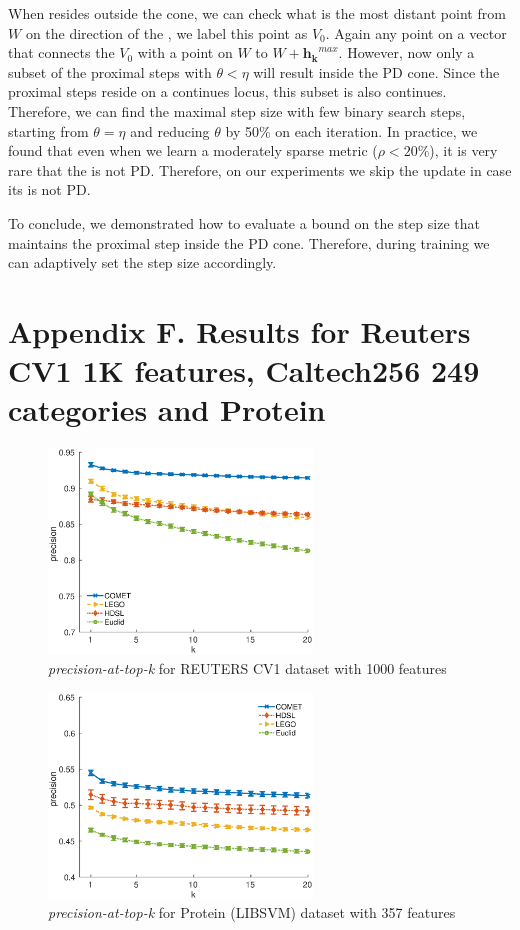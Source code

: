 \documentclass[twoside,11pt]{article}
\newcommand\mat[1]{{#1}}
\renewcommand\vec[1]{\mathbf{#1}}
\newcommand{\W}{\mat{W}}
\newcommand{\hk}{\vec{h_k}}
\begin{document}
When \Vkorigin resides outside the cone, we can check what is the most distant point from $\W$ on the direction of the \Vkorigin, we label this point as $V_0$. Again any point on a vector that connects the $V_0$ with a point on $\W$ to $\W + \hk^{max}$. However, now only a subset of the proximal steps with $\theta < \eta$ will result inside the PD cone. Since the proximal steps reside on a continues locus, this subset is also continues. Therefore, we can find the maximal step size with few binary search steps, starting from $\theta = \eta$ and reducing $\theta$ by 50\% on each iteration. In practice, we found that even when we learn a moderately sparse metric ($\rho <20\%$), it is very rare that the \Vkorigin is not PD. Therefore, on our experiments we skip the update in case its \Vkorigin is not PD.

To conclude, we demonstrated how to evaluate a bound on the step size that maintains the proximal step inside the PD cone. Therefore, during training we can adaptively set the step size accordingly. 

\section*{Appendix F. Results for Reuters CV1 1K features, Caltech256 249 categories and Protein}

\begin{figure}[h]
\centering
\includegraphics[width=7cm]{precision@k_rcv1_4_ig1000}
\caption*{\textit{precision-at-top-k} for REUTERS CV1 dataset with 1000 features}

\end{figure}

\begin{figure}[h]
\centering
\includegraphics[width=7cm]{precision@k_protein}
\caption*{\textit{precision-at-top-k} for Protein (LIBSVM) dataset with 357 features}
\end{figure}
\end{document}
